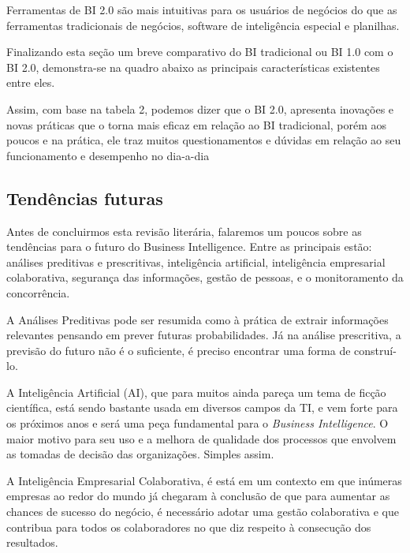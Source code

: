 Ferramentas de BI 2.0 s\~{a}o mais intuitivas para os usu\'{a}rios de neg\'{o}cios do que as ferramentas tradicionais de neg\'{o}cios, software de intelig\^{e}ncia especial e planilhas.

Finalizando esta se\c{c}\~{a}o um breve comparativo do BI tradicional ou BI 1.0 com o BI 2.0, demonstra-se na quadro abaixo as principais caracter\'{i}sticas existentes entre eles.



Assim, com base na tabela 2, podemos dizer que o BI 2.0, apresenta inova\c{c}\~{o}es e novas pr\'{a}ticas que o torna mais eficaz em rela\c{c}\~{a}o ao BI tradicional, por\'{e}m aos poucos e na pr\'{a}tica, ele traz muitos questionamentos e dúvidas em rela\c{c}\~{a}o ao seu funcionamento e desempenho no dia-a-dia

\subsection{Tend\^{e}ncias futuras}

Antes de concluirmos esta revis\~{a}o liter\'{a}ria, falaremos um poucos sobre as tend\^{e}ncias para o futuro do Business Intelligence. Entre as principais est\~{a}o: an\'{a}lises preditivas e prescritivas, intelig\^{e}ncia artificial, intelig\^{e}ncia empresarial colaborativa, seguran\c{c}a das informa\c{c}\~{o}es, gest\~{a}o de pessoas, e o monitoramento da concorr\^{e}ncia.

A An\'{a}lises Preditivas pode ser resumida como \`{a} pr\'{a}tica de extrair informa\c{c}\~{o}es relevantes pensando em prever futuras probabilidades. J\'{a} na an\'{a}lise prescritiva, a previs\~{a}o do futuro n\~{a}o \'{e} o suficiente, \'{e} preciso encontrar uma forma de constru\'{i}-lo.

A Intelig\^{e}ncia Artificial (AI), que para muitos ainda pare\c{c}a um tema de fic\c{c}\~{a}o cient\'{i}fica, est\'{a} sendo bastante usada em diversos campos da TI, e vem forte para os pr\'{o}ximos anos e ser\'{a} uma pe\c{c}a fundamental para o \textit{Business Intelligence}. O maior motivo para seu uso e a melhora de qualidade dos processos que envolvem as tomadas de decis\~{a}o das organiza\c{c}\~{o}es. Simples assim.

A Intelig\^{e}ncia Empresarial Colaborativa, \'{e} est\'{a} em um contexto em que inúmeras empresas ao redor do mundo j\'{a} chegaram \`{a} conclus\~{a}o de que para aumentar as chances de sucesso do neg\'{o}cio, \'{e} necess\'{a}rio adotar uma gest\~{a}o colaborativa e que contribua para todos os colaboradores no que diz respeito \`{a} consecu\c{c}\~{a}o dos resultados.

